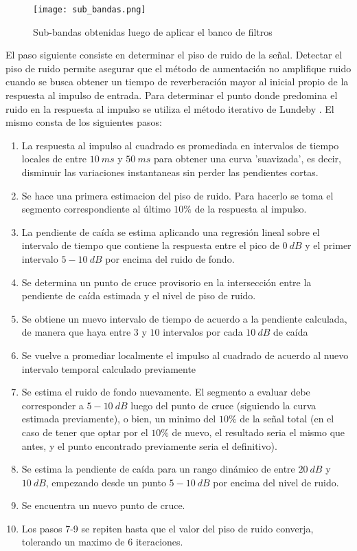 \begin{figure}[H]
	\centering{}
	\texttt{[image: sub\_bandas.png]}
	\caption{Sub-bandas obtenidas luego de aplicar el banco de filtros}
	\label{fig:sub_bandas}
\end{figure}

El paso siguiente consiste en determinar el piso de ruido de la señal. Detectar el piso de ruido permite asegurar que el método de aumentación no amplifique ruido cuando se busca obtener un tiempo de reverberación mayor al inicial propio de la respuesta al impulso de entrada. Para determinar el punto donde predomina el ruido en la respuesta al impulso se utiliza el método iterativo de Lundeby \cite{Lundeby}. El mismo consta de los siguientes pasos: 

\begin{enumerate}
\item La respuesta al impulso al cuadrado es promediada en intervalos de tiempo locales de entre $10 \ ms$ y $50 \ ms$ para obtener una curva 'suavizada', es decir, disminuir las variaciones instantaneas sin perder las pendientes cortas.
\item Se hace una primera estimacion del piso de ruido. Para hacerlo se toma el segmento correspondiente al último $10\%$ de la respuesta al impulso.
\item La pendiente de caída se estima aplicando una regresión lineal sobre el intervalo de tiempo que contiene la respuesta entre el pico de $0 \ dB$ y el primer intervalo $5-10 \ dB$ por encima del ruido de fondo.
\item Se determina un punto de cruce provisorio en la intersección entre la pendiente de caída estimada y el nivel de piso de ruido.
\item Se obtiene un nuevo intervalo de tiempo de acuerdo a la pendiente calculada, de manera que haya entre $3$ y $10$ intervalos por cada $10 \ dB$ de caída
\item Se vuelve a promediar localmente el impulso al cuadrado de acuerdo al nuevo intervalo temporal calculado previamente 
\item Se estima el ruido de fondo nuevamente. El segmento a evaluar debe corresponder a $5-10 \ dB$ luego del punto de cruce (siguiendo la curva estimada previamente), o bien, un minimo del $10\%$ de la señal total (en el caso de tener que optar por el $10\%$ de nuevo, el resultado seria el mismo que antes, y el punto encontrado previamente seria el definitivo).
\item Se estima la pendiente de caída para un rango dinámico de entre $20 \ dB$ y $10 \ dB$, empezando desde un punto $5-10 \ dB$ por encima del nivel de ruido.
\item Se encuentra un nuevo punto de cruce.
\item Los pasos 7-9 se repiten hasta que el valor del piso de ruido converja, tolerando un maximo de 6 iteraciones.
\end{enumerate}

